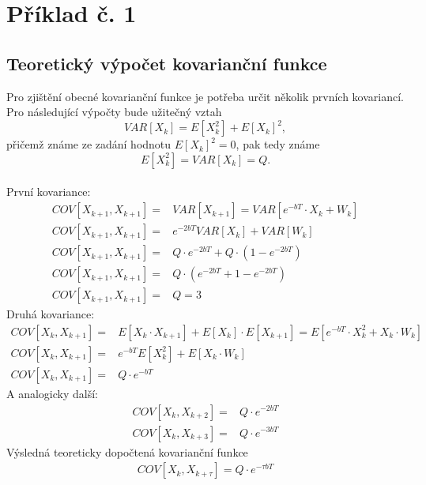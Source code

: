 \documentclass{article}
\begin{document}
	
	
	
	
	\section{Příklad č. 1}
		\subsection{Teoretický výpočet kovarianční funkce}
			Pro zjištění obecné kovarianční funkce je potřeba určit několik prvních kovariancí. Pro následující výpočty bude užitečný vztah \[VAR[X_{k}]=E[X_{k}^{2}]+E[X_{k}]^{2},\] přičemž známe ze zadání hodnotu \(E[X_{k}]^{2}=0\), pak tedy známe \[E[X_{k}^{2}]=VAR[X_{k}]=Q.\]\\
			První kovariance:
			\begin{align}
				COV[X_{k+1},X_{k+1}] =& VAR[X_{k+1}]=VAR[e^{-bT}\cdot X_{k}+W_{k}] \\
 				COV[X_{k+1},X_{k+1}] =& e^{-2bT}VAR[X_{k}] + VAR[W_{k}]\\
 				COV[X_{k+1},X_{k+1}] =& Q\cdot e^{-2bT} + Q\cdot (1-e^{-2bT})\\
 				COV[X_{k+1},X_{k+1}] =& Q\cdot (e^{-2bT} + 1 - e^{-2bT})\\
 				COV[X_{k+1},X_{k+1}] =& Q = 3
			\end{align}
			Druhá kovariance:
			\begin{align}
				COV[X_{k},X_{k+1}] =& E[X_{k}\cdot X_{k+1}]+E[X_{k}]\cdot E[X_{k+1}]=E[e^{-bT}\cdot X_{k}^{2}+X_{k}\cdot W_{k}] \\
				COV[X_{k},X_{k+1}] =& e^{-bT}E[X_{k}^{2}] + E[X_{k}\cdot W_{k}]\\
				COV[X_{k},X_{k+1}] =& Q\cdot e^{-bT}
			\end{align}
			A analogicky další:
			\begin{align}
				COV[X_{k},X_{k+2}] =& Q\cdot e^{-2bT}\\
				COV[X_{k},X_{k+3}] =& Q\cdot e^{-3bT}
			\end{align}
			Výsledná teoreticky dopočtená kovarianční funkce
			\begin{align}
				COV[X_{k},X_{k+\tau}] = Q\cdot e^{-\tau bT} 
			\end{align}
\end{document}
